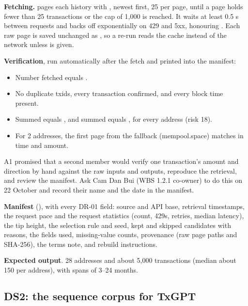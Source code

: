 \textbf{Fetching.}  pages each history with
, newest first, 25 per page, until a page holds fewer
than 25 transactions or the cap of 1,000 is reached. It waits at least 0.5 s between requests and
backs off exponentially on 429 and 5xx, honouring . Each raw page is saved
unchanged as , so a re-run reads the cache
instead of the network unless  is given.

\textbf{Verification}, run automatically after the fetch and printed into the manifest:
\begin{itemize}
  \item Number fetched equals .
  \item No duplicate txids, every transaction confirmed, and every block time present.
  \item Summed  equals , and summed  equals
    , for every address (risk 18).
  \item For 2 addresses, the first page from the fallback (mempool.space) matches in time and
    amount.
\end{itemize}

\begin{team}
A1 promised that a second member would verify one transaction's amount and direction by hand
against the raw inputs and outputs, reproduce the retrieval, and review the manifest. Ask Cam
Dan Bui (WBS 1.2.1 co-owner) to do this on 22 October and record their name and the date in the
manifest.
\end{team}

\textbf{Manifest} (), with every DR-01 field: source
and API base, retrieval timestamps, the request pace and the request statistics (count, 429s,
retries, median latency), the tip height, the selection rule and seed, kept and skipped
candidates with reasons, the fields used, missing-value counts, provenance (raw page paths and
SHA-256), the terms note, and rebuild instructions.

\textbf{Expected output}\est{}. 28 addresses and about 5,000 transactions (median about 150 per
address), with spans of 3--24 months.

\subsection{DS2: the sequence corpus for TxGPT}
\label{sec:ds2}

